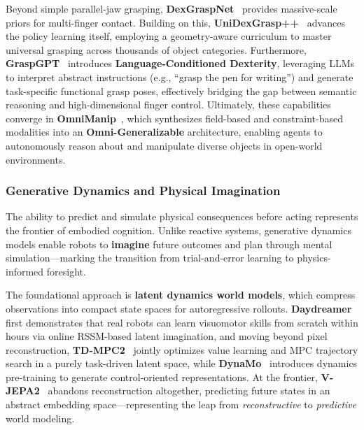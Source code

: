 \documentclass[acmsmall,screen,review,anonymous]{acmart}
\begin{document}
Beyond simple parallel-jaw grasping, \textbf{DexGraspNet}~\cite{wang2023dexgraspnetlargescaleroboticdexterous} provides massive-scale priors for multi-finger contact. Building on this, \textbf{UniDexGrasp++}~\cite{unidexgrasp2024} advances the policy learning itself, employing a geometry-aware curriculum to master universal grasping across thousands of object categories. Furthermore, \textbf{GraspGPT}~\cite{tang2023graspgpt} introduces \textbf{Language-Conditioned Dexterity}, leveraging LLMs to interpret abstract instructions (e.g., ``grasp the pen for writing'') and generate task-specific functional grasp poses, effectively bridging the gap between semantic reasoning and high-dimensional finger control. Ultimately, these capabilities converge in \textbf{OmniManip}~\cite{pan2025omnimanip}, which synthesizes field-based and constraint-based modalities into an \textbf{Omni-Generalizable} architecture, enabling agents to autonomously reason about and manipulate diverse objects in open-world environments.

\subsubsection{Generative Dynamics and Physical Imagination}\label{sec:generative_dynamics}

The ability to predict and simulate physical consequences before acting represents the frontier of embodied cognition. Unlike reactive systems, generative dynamics models enable robots to \textbf{imagine} future outcomes and plan through mental simulation---marking the transition from trial-and-error learning to physics-informed foresight.

The foundational approach is \textbf{latent dynamics world models}, which compress observations into compact state spaces for autoregressive rollouts. \textbf{Daydreamer}~\cite{wu2023daydreamer} first demonstrates that real robots can learn visuomotor skills from scratch within hours via online RSSM-based latent imagination, and moving beyond pixel reconstruction, \textbf{TD-MPC2}~\cite{hansen2024tdmpc2} jointly optimizes value learning and MPC trajectory search in a purely task-driven latent space, while \textbf{DynaMo}~\cite{cui2024dynamo} introduces dynamics pre-training to generate control-oriented representations. At the frontier, \textbf{V-JEPA2}~\cite{assran2025vjepa} abandons reconstruction altogether, predicting future states in an abstract embedding space---representing the leap from \emph{reconstructive} to \emph{predictive} world modeling.
\end{document}
